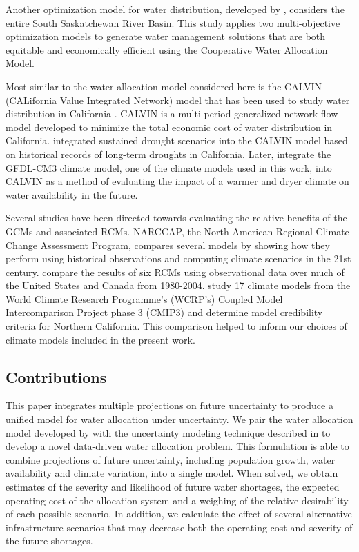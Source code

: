 \documentclass[11pt]{article}
\theoremstyle{plain}
\theoremstyle{definition}
\theoremstyle{remark}
\begin{document}
Another optimization model for water distribution, developed by \citet{wang2008basin}, considers the entire South Saskatchewan River Basin.
This study applies two multi-objective optimization models to generate water management solutions that are both equitable and economically efficient using the Cooperative Water Allocation Model.

Most similar to the water allocation model considered here is the CALVIN (CALifornia Value Integrated Network) model that has been used to study water distribution in California \citep{draper_etal_03,jenkins2004optimization}.
CALVIN is a multi-period generalized network flow model developed to minimize the total economic cost of water distribution in California.
\citet{harou2010economic} integrated sustained drought scenarios into the CALVIN model based on historical records of long-term droughts in California.
Later, \citet{connell2011adapting} integrate the GFDL-CM3 climate model, one of the climate models used in this work, into CALVIN as a method of evaluating the impact of a warmer and dryer climate on water availability in the future.

Several studies have been directed towards evaluating the relative benefits of the GCMs and associated RCMs.
NARCCAP, the North American Regional Climate Change Assessment Program, compares several models by showing how they perform using historical observations and computing climate scenarios in the 21st century.
\citet{mearns2012north} compare the results of six RCMs using observational data over much of the United States and Canada from 1980-2004.
\citet{brekke2008significance} study 17 climate models from the World Climate Research Programme's (WCRP's) Coupled Model Intercomparison Project
phase 3 (CMIP3) and determine model credibility criteria for Northern California.
This comparison helped to inform our choices of climate models included in the present work.

\subsection{Contributions}

This paper integrates multiple projections on future uncertainty to produce a unified model for water allocation under uncertainty.
We pair the water allocation model developed by \citet{woods2012centralized} with the uncertainty modeling technique described in \citep{love2013phi} to develop a novel data-driven water allocation problem.
This formulation is able to combine projections of future uncertainty, including population growth, water availability and climate variation, into a single model.
When solved, we obtain estimates of the severity and likelihood of future water shortages, the expected operating cost of the allocation system and a weighing of the relative desirability of each possible scenario.
In addition, we calculate the effect of several alternative infrastructure scenarios that may decrease both the operating cost and severity of the future shortages.
\end{document}
